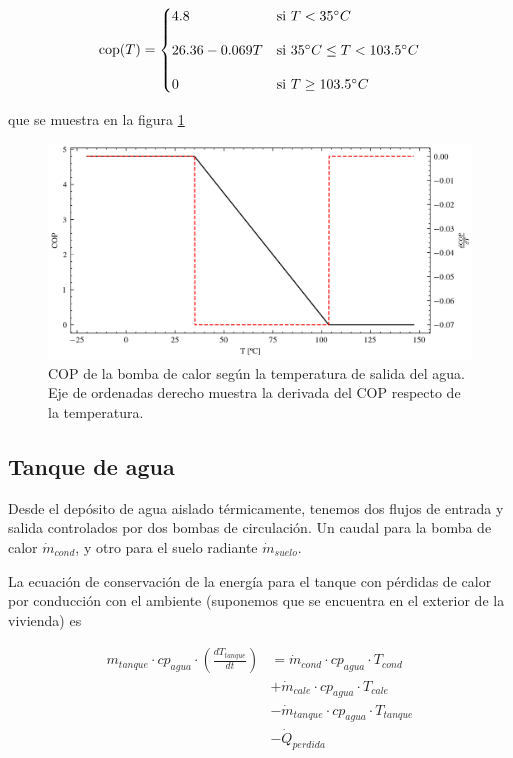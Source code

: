 \begin{equation}
	\text{\text{cop}}(T) =
	\begin{cases}
		4.8              & \text{si } T < 35^\circ C                    \\[10pt]
		26.36 - 0.069 T & \text{si } 35^\circ C \leq T < 103.5^\circ C \\[10pt]
		0                & \text{si } T \geq 103.5^\circ C
	\end{cases}
\end{equation}

que se muestra en la figura \ref{fig:heat_pump_cop}

\begin{figure}[h] \centering
	\centering
	\includegraphics[width=1\textwidth]{./capitulos/resultados_discusion/images/heat_pump_cop.png}
	\caption{COP de la bomba de calor según la temperatura de salida del agua.
		Eje de ordenadas derecho muestra la derivada del COP respecto de la
		temperatura.}
	\label{fig:heat_pump_cop}
\end{figure}


\subsection{Tanque de agua}

Desde el depósito de agua aislado térmicamente, tenemos dos flujos de entrada y
salida controlados por dos bombas de circulación. Un caudal para la bomba de
calor $\dot{m}_{cond}$, y otro para el suelo radiante $\dot{m}_{suelo}$.

La ecuación de conservación de la energía para el tanque con pérdidas de calor
por conducción con el ambiente (suponemos que se encuentra en el exterior de la
vivienda) es

\begin{align} \label{eq:t_tanque_balance}
	m_{tanque} \cdot cp_{agua} \cdot \left( \frac{dT_{tanque}}{dt} \right) & = \dot{m}_{cond} \cdot cp_{agua} \cdot T_{cond} \nonumber     \\
	                                                                       & + \dot{m}_{cale} \cdot cp_{agua} \cdot T_{cale} \nonumber     \\
	                                                                       & - \dot{m}_{tanque} \cdot cp_{agua} \cdot T_{tanque} \nonumber \\
	                                                                       & - \dot{Q}_{perdida}
\end{align}


